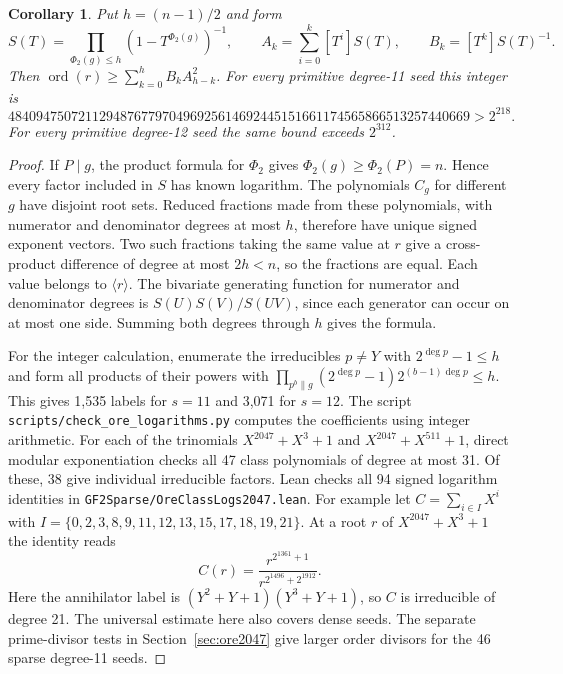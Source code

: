 \documentclass[11pt]{article}
\newtheorem{corollary}[theorem]{Corollary}
\newcommand{\ord}{\operatorname{ord}}
\begin{document}
\begin{corollary}\label{cor:ore-fraction-bound}
Put \(h=(n-1)/2\) and form
\[
 S(T)=\prod_{\Phi_2(g)\le h}(1-T^{\Phi_2(g)})^{-1},\qquad
 A_k=\sum_{i=0}^k[T^i]S(T),\qquad B_k=[T^k]S(T)^{-1}.
\]
Then \(\ord(r)\ge\sum_{k=0}^h B_k A_{h-k}^2\).
For every primitive degree-11 seed this integer is
\[
 484094750721129487677970496925614692445151661174565866513257440669
 >2^{218}.
\]
For every primitive degree-12 seed the same bound exceeds \(2^{312}\).
\end{corollary}
\begin{proof}
If \(P\mid g\), the product formula for \(\Phi_2\) gives
\(\Phi_2(g)\ge\Phi_2(P)=n\). Hence every factor included in \(S\) has
known logarithm. The polynomials \(C_g\) for different \(g\) have
disjoint root sets. Reduced fractions made from these polynomials,
with numerator and denominator degrees at most \(h\), therefore have
unique signed exponent vectors. Two such fractions taking the same
value at \(r\) give a cross-product difference of degree at most
\(2h<n\), so the fractions are equal. Each value belongs to
\(\langle r\rangle\). The bivariate generating function for numerator
and denominator degrees is \(S(U)S(V)/S(UV)\), since each generator
can occur on at most one side. Summing both degrees through \(h\)
gives the formula.

For the integer calculation, enumerate the irreducibles \(p\ne Y\)
with \(2^{\deg p}-1\le h\) and form all products of their powers
with \(\prod_{p^b\parallel g}(2^{\deg p}-1)2^{(b-1)\deg p}\le h\).
This gives 1,535 labels for \(s=11\) and 3,071 for \(s=12\).
The script \nolinkurl{scripts/check_ore_logarithms.py} computes the
coefficients using integer arithmetic. For each of the trinomials
\(X^{2047}+X^3+1\) and \(X^{2047}+X^{511}+1\), direct modular
exponentiation checks all 47 class polynomials of degree at most 31.
Of these, 38 give individual irreducible factors.
Lean checks all 94 signed logarithm identities in
\nolinkurl{GF2Sparse/OreClassLogs2047.lean}. For example let
\(C=\sum_{i\in I}X^i\) with
\(I=\{0,2,3,8,9,11,12,13,15,17,18,19,21\}\).
At a root \(r\) of \(X^{2047}+X^3+1\) the identity reads
\[
        C(r)=\frac{r^{2^{1361}+1}}{r^{2^{1496}+2^{1912}}}.
\]
Here the annihilator label is
\((Y^2+Y+1)(Y^3+Y+1)\), so \(C\) is irreducible of degree 21.
The universal estimate here also covers dense seeds. The separate
prime-divisor tests in Section~\ref{sec:ore2047} give larger order
divisors for the 46 sparse degree-11 seeds.
\end{proof}
\end{document}
